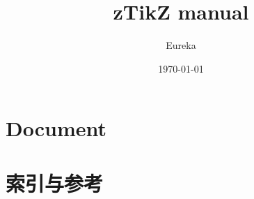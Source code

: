 \documentclass[
  hyper,    
  lang=cn,
  class=book,
  mathSpec={envStyle=leftbar, alias},
  toc={redef, 2column}
]{zlatex}
\title{zTikZ manual}
\author{Eureka}
\date{\today}
\begin{document}
\maketitle
\frontmatter
\tableofcontents
\mainmatter
\part{Document}



\part{索引与参考}
\printindex




\end{document}
